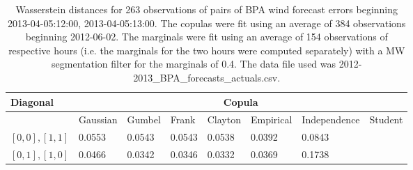 \begin{table}[h] 
    \centering 
    \begin{tabular}{|l|l|l|l|l|l|l|l|} \hline 
        \textbf{Diagonal} & \multicolumn{7}{c|}{\textbf{Copula}} \\ \hline 
        & Gaussian & Gumbel & Frank & Clayton & Empirical & Independence & Student \\ \hline 
        $[0,0], [1,1]$ & 0.0553 & 0.0543 & 0.0543 & 0.0538 & 0.0392 & 0.0843 &  \\ \hline 
        $[0,1], [1,0]$ & 0.0466 & 0.0342 & 0.0346 & 0.0332 & 0.0369 & 0.1738 &  \\ \hline 
    \end{tabular} 
    \caption{Wasserstein distances for 263 observations of pairs of BPA wind forecast errors beginning 2013-04-05:12:00, 2013-04-05:13:00. The copulas were fit  using an average of 384 observations beginning 2012-06-02. The marginals were fit using an average of 154 observations of respective hours (i.e. the  marginals for the two hours were computed separately) with a MW segmentation filter for the marginals of 0.4. The data file used was 2012-2013\_BPA\_forecasts\_actuals.csv.} 
\end{table}